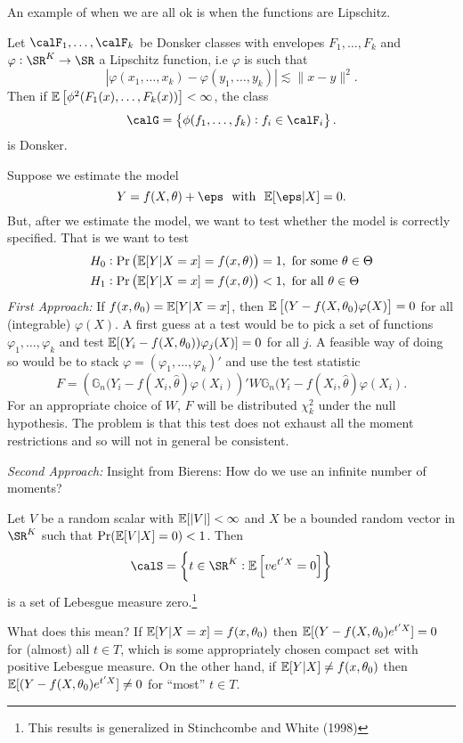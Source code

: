 An example of when we are all ok is when the functions are Lipschitz. 
\begin{theorem}
	\label{thm:lipschitz-donsker}
	Let \(\calF_1,\dots,\calF_k\) be Donsker classes with envelopes \(F_1,\dots,F_k\) and \(\varphi:\SR^K\to\SR\) a Lipschitz function, i.e \(\varphi\) is such that 
	\[
		\left|\varphi(x_1,\dots,x_k) - \varphi(y_1,\dots,y_k)\right| \lesssim \|x-y\|^2 
	.\]
	Then if \(\mathbb{E}\left[\phi^2(F_1(x),\dots,F_k(x))\right] < \infty\), the class 
	\[
		\calG = \left\{\phi(f_1,\dots,f_k): f_i\in\calF_i\right\}
	.\]
	is Donsker.
\end{theorem}
\begin{example*}
	Suppose we estimate the model
	\[
		Y = f(X,\theta) + \eps\hbox{ }\text{ with }\hbox{ }\E[\eps|X]=0
	.\]
	But, after we estimate the model, we want to test whether the model is correctly specified. That is we want to test
	\begin{align*}
		\centering
		H_0&: \Pr\left(\E[Y|X=x] = f(x,\theta)\right) = 1,\text{ for some \(\theta\in\Theta\)} \\
		H_1&: \Pr\left(\E[Y|X=x] = f(x,\theta)\right) < 1,\text{ for all } \theta\in\Theta
	\end{align*}
	\textit{First Approach: }If \(f(x,\theta_0) = \mathbb{E}[Y|X=x]\), then \(\mathbb{E}\left[(Y-f(X,\theta_0)\varphi(X)\right] = 0\) for all (integrable) \(\varphi(X)\). A first guess at a test would be to pick a set of functions \(\varphi_1,\dots,\varphi_k\) and test \(\mathbb{E}[(Y_i-f(X,\theta_0))\varphi_j(X)] = 0\) for all \(j\). A feasible way of doing so would be to stack \(\varphi= (\varphi_1,\dots,\varphi_k)'\) and use the test statistic
	\[
		F = \left(\mathbb{G}_n(Y_i-f(X_i,\hat\theta)\varphi(X_i)\right)'W\mathbb{G}_n(Y_i-f(X_i,\hat\theta)\varphi(X_i)
	.\] 
	For an appropriate choice of \(W\), \(F\) will be distributed \(\chi^2_k\) under the null hypothesis. The problem is that this test does not exhaust all the moment restrictions and so will not in general be consistent. 

	\textit{Second Approach: } Insight from Bierens: How do we use an infinite number of moments?
	\begin{lemma}[Bierens 1990]
		\label{lemma:bierens-1990}
		Let \(V\) be a random scalar with \(\mathbb{E}[|V|]<\infty\) and \(X\) be a bounded random vector in \(\SR^K\) such that \(\Pr(\mathbb{E}[V|X]=0)<1\). Then \[\calS = \left\{t\in\SR^K: \E\left[ve^{t'X}=0\right]\right\}\] is a set of Lebesgue measure zero.\footnote{This results is generalized in Stinchcombe and White (1998)}
	\end{lemma}
	What does this mean? If \(\mathbb{E}[Y|X=x]=f(x,\theta_0)\) then \(\mathbb{E}[(Y-f(X,\theta_0)e^{t'X}]=0\) for (almost) all \(t\in T\), which is some appropriately chosen compact set with positive Lebesgue measure. On the other hand, if \(\mathbb{E}[Y|X]\neq f(x,\theta_0)\) then \(\mathbb{E}[(Y-f(X,\theta_0)e^{t'X}]\neq0\) for ``most'' \(t\in T\).


\end{example*}
